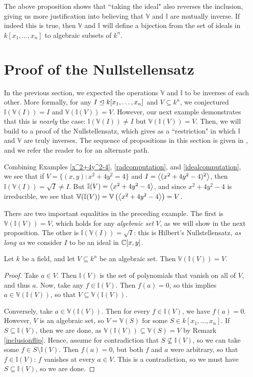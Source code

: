 \documentclass{article}
\newcommand{\V}{\mathbb V}
\newcommand{\I}{\mathbb I}
\begin{document}
The above proposition shows that ``taking the ideal" also reverses the inclusion, giving us more justification into believing that $\V$ and $\I$ are mutually inverse. If indeed this is true, then $\V$ and $\I$ will define a bijection from the set of ideals in $k[x_1,\ldots, x_n]$ to algebraic subsets of $k^n$.

\section{Proof of the Nullstellensatz}
In the previous section, we expected the operations $\V$ and $\I$ to be inverses of each other. More formally, for any $I\trianglelefteq k[x_1,\ldots, x_n]$ and $V\subseteq k^n$, we conjectured $\I(\V(I)) = I$ and $\V(\I(V)) = V$. However, our next example demonstrates that this is \textit{nearly} the case: $\I(\V(I))\neq I$ but $\V(\I(V)) =V$. Then, we will build to a proof of the Nullstellensatz, which gives as a ``restriction" in which $\I$ and $\V$ are truly inverses. The sequence of propositions in this section is given in \cite{dummit}, and we refer the reader to \cite{allcock} for an alternate path.
\begin{example}
Combining Examples \ref{x^2+4y^2-4}, \ref{radcomputation}, and \ref{idealcomputation}, we see that if $V = \{(x,y): x^2+4y^2=4\}$ and $I = \left\langle(x^2+4y^2-4)^2\right\rangle$, then $\I(\V(I)) = \sqrt I \neq I$. But $\I(V) = \gen{x^2 + 4y^2 - 4}$, and since $x^2+4y^2-4$ is irreducible, we see that $\V(\I(V))=\V\paren{\gen{x^2+4y^2-4}} = V$.
\end{example}

There are two important equalities in the preceding example. The first is $\V(\I(V)) = V$, which holds for any \textit{algebraic set} $V$, as we will show in the next proposition. The other is $\I(\V(I)) = \sqrt I$: this is Hilbert's Nullstellensatz, \textit{as long as} we consider $I$ to be an ideal in $\mathbb C[x, y]$.
\begin{proposition} \label{revnull}
Let $k$ be a field, and let $V\subseteq k^n$ be an algebraic set. Then $\V(\I(V)) = V.$
\end{proposition}
\begin{proof}
Take $a\in V$. Then $\I(V)$ is the set of polynomials that vanish on all of $V$, and thus $a$. Now, take any $f\in \I(V)$. Then $f(a) = 0$, so this implies $a\in \V(\I(V))$, so that $V\subseteq \V(\I(V))$. 

Conversely, take $a\in \V(\I(V))$. Then for every $f\in \I(V)$, we have $f(a) = 0$. However, $V$ is an algebraic set, so $V = \V(S)$ for some $S\in k[x_1, \ldots, x_n]$. If $S\subseteq \I(V)$, then we are done, as $\V(\I(V)) \subseteq \V(S) = V$ by Remark \ref{inclusionflip}. Hence, assume for contradiction that $S\not\subseteq \I(V)$, so we can take some $f\in S\setminus \I(V)$. Then $f(a) = 0$, but both $f$ and $a$ were arbitrary, so that $f\in \I(V)$: $f$ vanishes at every $a\in V$. This is a contradiction, so we must have $S\subseteq \I(V)$, so we are done.
\end{proof}
\end{document}
